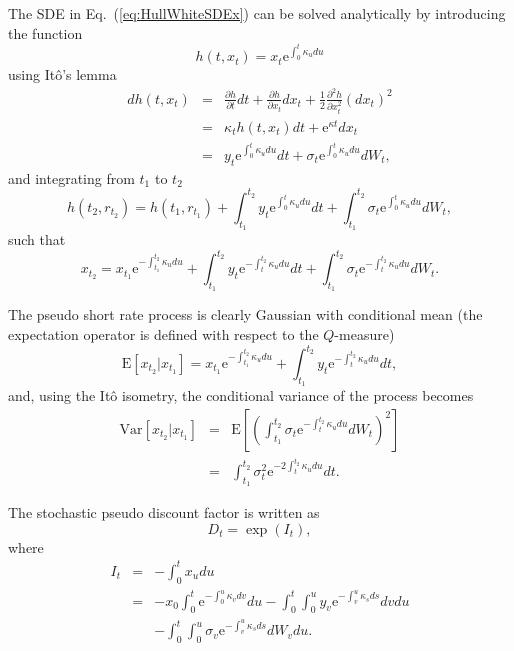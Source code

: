 \documentclass{report}
\newcommand{\E}{\mathrm{E}}
\newcommand{\Var}{\mathrm{Var}}
\newcommand{\e}{\text{e}}
\begin{document}
The SDE in Eq.~(\ref{eq:HullWhiteSDEx}) can be solved analytically by introducing the function
\begin{equation}
h(t, x_t) = x_t \e^{\int_0^t \kappa_u du}
\end{equation}
using It\^{o}'s lemma
\begin{eqnarray}
dh(t, x_t) &=& \frac{\partial h}{\partial t} dt + \frac{\partial h}{\partial x_t} dx_t + \frac{1}{2}\frac{\partial^2 h}{\partial x_t^2} \left(dx_t\right)^2 \\
&=& \kappa_t h(t, x_t) dt + \e^{\kappa t} dx_t \\
&=& y_t \e^{\int_0^t \kappa_u du} dt + \sigma_t \e^{\int_0^t \kappa_u du} dW_t,
\end{eqnarray}
and integrating from $t_1$ to $t_2$
\begin{equation}
h(t_2, r_{t_2}) = h(t_1, r_{t_1}) + \int_{t_1}^{t_2} y_t \e^{\int_0^t \kappa_u du} dt + \int_{t_1}^{t_2} \sigma_t \e^{\int_0^t \kappa_u du} dW_t,
\end{equation}
such that
\begin{equation}
x_{t_2} = x_{t_1} \e^{-\int_{t_1}^{t_2} \kappa_u du}  + \int_{t_1}^{t_2} y_t \e^{-\int_t^{t_2} \kappa_u du} dt + \int_{t_1}^{t_2} \sigma_t \e^{-\int_t^{t_2} \kappa_u du} dW_t.
\end{equation}

The pseudo short rate process is clearly Gaussian with conditional mean (the expectation operator is defined with respect to the $Q$-measure)
\begin{equation}
\E \left[ x_{t_2} | x_{t_1} \right] = x_{t_1} \e^{-\int_{t_1}^{t_2} \kappa_u du}  + \int_{t_1}^{t_2} y_t \e^{-\int_t^{t_2} \kappa_u du} dt,
\end{equation}
and, using the It\^{o} isometry, the conditional variance of the process becomes
\begin{eqnarray}
\Var \left[ x_{t_2} | x_{t_1} \right] &=& \E \left[ \left( \int_{t_1}^{t_2} \sigma_t \e^{-\int_t^{t_2} \kappa_u du} dW_t \right)^2 \right] \\
&=& \int_{t_1}^{t_2} \sigma_t^2 \e^{-2\int_t^{t_2} \kappa_u du} dt.
\end{eqnarray}

The stochastic pseudo discount factor is written as
\begin{equation}
D_{t} = \exp \left( I_t \right),
\end{equation}
where
\begin{eqnarray}
I_t &=& -\int_0^t x_u du \\
&=& - x_{0} \int_0^t \e^{-\int_{0}^{u} \kappa_v dv} du - \int_0^t\int_{0}^{u} y_v \e^{-\int_v^{u} \kappa_s ds} dv du \\
&& - \int_0^t \int_{0}^{u} \sigma_v \e^{-\int_v^{u} \kappa_s ds} dW_v du.
\end{eqnarray}
\end{document}

